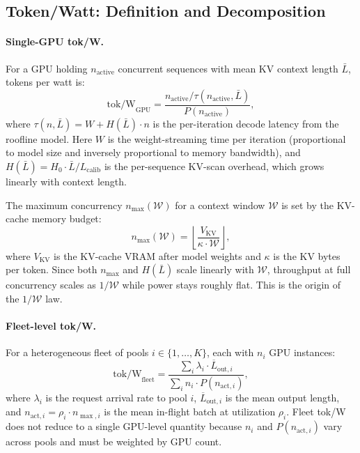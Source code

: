 \documentclass[11pt,a4paper]{article}
\newcommand{\tpw}{\text{tok/W}}
\newcommand{\nmax}{n_{\max}}
\newcommand{\nact}{n_{\text{active}}}
\begin{document}
\subsection{Token/Watt: Definition and Decomposition}
\label{sec:tpw-def}

\paragraph{Single-GPU tok/W.}
For a GPU holding $\nact$ concurrent sequences with mean KV context length
$\bar{L}$, tokens per watt is:
\begin{equation}
  \tpw_{\text{GPU}} = \frac{\nact / \tau(\nact, \bar{L})}{P(\nact)},
  \label{eq:single-tpw}
\end{equation}
where $\tau(n, \bar{L}) = W + H(\bar{L}) \cdot n$ is the per-iteration decode
latency from the roofline model.  Here $W$ is the weight-streaming time per
iteration (proportional to model size and inversely proportional to memory
bandwidth), and $H(\bar{L}) = H_0 \cdot \bar{L}/L_{\text{calib}}$ is the
per-sequence KV-scan overhead, which grows linearly with context length.

The maximum concurrency $\nmax(\mathcal{W})$ for a context window
$\mathcal{W}$ is set by the KV-cache memory budget:
\begin{equation}
  \nmax(\mathcal{W}) = \left\lfloor
    \frac{V_{\text{KV}}}{\kappa \cdot \mathcal{W}}
  \right\rfloor,
  \label{eq:nmax}
\end{equation}
where $V_{\text{KV}}$ is the KV-cache VRAM after model weights and $\kappa$
is the KV bytes per token.  Since both $\nmax$ and $H(\bar{L})$ scale linearly
with $\mathcal{W}$, throughput at full concurrency scales as $1/\mathcal{W}$
while power stays roughly flat.  This is the origin of the $1/\mathcal{W}$
law.

\paragraph{Fleet-level tok/W.}
For a heterogeneous fleet of pools $i \in \{1, \ldots, K\}$, each with $n_i$
GPU instances:
\begin{equation}
  \tpw_{\text{fleet}} = \frac{\sum_i \lambda_i \cdot \overline{L}_{\text{out},i}}
    {\sum_i n_i \cdot P(n_{\text{act},i})},
  \label{eq:fleet-tpw}
\end{equation}
where $\lambda_i$ is the request arrival rate to pool $i$,
$\overline{L}_{\text{out},i}$ is the mean output length, and
$n_{\text{act},i} = \rho_i \cdot n_{\max,i}$ is the mean in-flight batch at
utilization $\rho_i$.  Fleet tok/W does not reduce to a single GPU-level
quantity because $n_i$ and $P(n_{\text{act},i})$ vary across pools and must
be weighted by GPU count.
\end{document}
